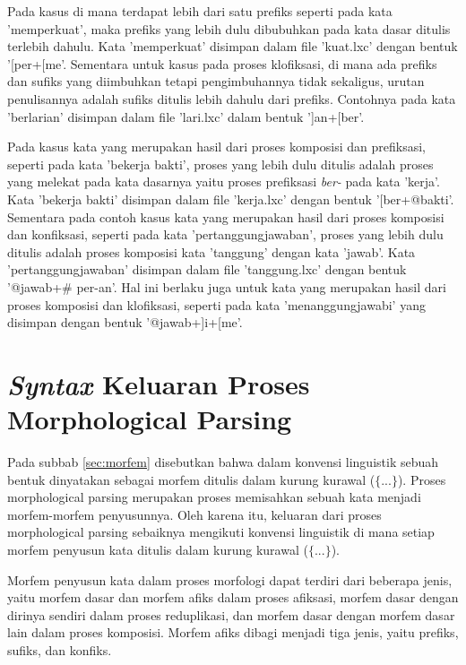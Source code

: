 Pada kasus di mana terdapat lebih dari satu prefiks seperti pada kata 'memperkuat', maka prefiks yang lebih dulu dibubuhkan pada kata dasar ditulis terlebih dahulu. Kata 'memperkuat' disimpan dalam file 'kuat.lxc' dengan bentuk '[per+[me'. Sementara untuk kasus pada proses klofiksasi, di mana ada prefiks dan sufiks yang diimbuhkan tetapi pengimbuhannya tidak sekaligus, urutan penulisannya adalah sufiks ditulis lebih dahulu dari prefiks. Contohnya pada kata 'berlarian' disimpan dalam file 'lari.lxc' dalam bentuk ']an+[ber'.

Pada kasus kata yang merupakan hasil dari proses komposisi dan prefiksasi, seperti pada kata 'bekerja bakti', proses yang lebih dulu ditulis adalah proses yang melekat pada kata dasarnya yaitu proses prefiksasi \textit{ber-} pada kata 'kerja'. Kata 'bekerja bakti' disimpan dalam file 'kerja.lxc' dengan bentuk '[ber+@bakti'. Sementara pada contoh kasus kata yang merupakan hasil dari proses komposisi dan konfiksasi, seperti pada kata 'pertanggungjawaban', proses yang lebih dulu ditulis adalah proses komposisi kata 'tanggung' dengan kata 'jawab'. Kata 'pertanggungjawaban' disimpan dalam file 'tanggung.lxc' dengan bentuk '@jawab+\# per-an'. Hal ini berlaku juga untuk kata yang merupakan hasil dari proses komposisi dan klofiksasi, seperti pada kata 'menanggungjawabi' yang disimpan dengan bentuk '@jawab+]i+[me'.


\section{\textit{Syntax} Keluaran Proses Morphological Parsing}
\label{sec:syntaxKeluaran}

Pada subbab \ref{sec:morfem} disebutkan bahwa dalam konvensi linguistik sebuah bentuk dinyatakan sebagai morfem ditulis dalam kurung kurawal ($\lbrace$...$\rbrace$). Proses morphological parsing merupakan proses memisahkan sebuah kata menjadi morfem-morfem penyusunnya. Oleh karena itu, keluaran dari proses morphological parsing sebaiknya mengikuti konvensi linguistik di mana setiap morfem penyusun kata ditulis dalam kurung kurawal ($\lbrace$...$\rbrace$).

Morfem penyusun kata dalam proses morfologi dapat terdiri dari beberapa jenis, yaitu morfem dasar dan morfem afiks dalam proses afiksasi, morfem dasar dengan dirinya sendiri dalam proses reduplikasi, dan morfem dasar dengan morfem dasar lain dalam proses komposisi. Morfem afiks dibagi menjadi tiga jenis, yaitu prefiks, sufiks, dan konfiks. 

